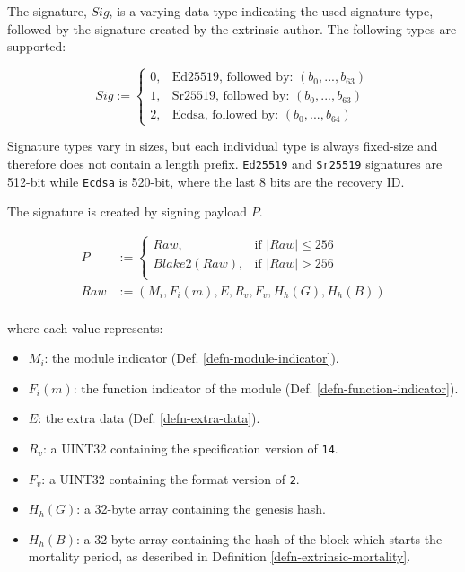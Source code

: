 \begin{definition}
    \label{defn-extrinsic-signature}
    The signature, $Sig$, is a varying data type indicating the used signature
    type, followed by the signature created by the extrinsic author. The
    following types are supported:

    \[
        Sig :=
        \begin{cases}
        0, & \text{Ed25519, followed by: } (b_0, ...,b_{63}) \\
        1, & \text{Sr25519, followed by: } (b_0, ...,b_{63}) \\
        2, & \text{Ecdsa, followed by: } (b_0, ...,b_{64})
        \end{cases}
    \]

    Signature types vary in sizes, but each individual type is always fixed-size
    and therefore does not contain a length prefix. \verb|Ed25519| and
    \verb|Sr25519| signatures are 512-bit while \verb|Ecdsa| is 520-bit, where
    the last 8 bits are the recovery ID.
    \newline

    The signature is created by signing payload $P$.

    \begin{equation}
        \begin{aligned}
        P &:= \begin{cases}
            Raw, & \text{if } |Raw| \leq 256\\
            Blake2(Raw), & \text{if } |Raw| > 256\\
        \end{cases}\\
        Raw &:= (M_i, F_i(m), E, R_v, F_v, H_h(G), H_h(B))\\
        \end{aligned}
    \end{equation}

    where each value represents:
    \begin{itemize}
        \item $M_i$: the module indicator (Def. \ref{defn-module-indicator}).
        \item $F_i(m)$: the function indicator of the module
        (Def. \ref{defn-function-indicator}).
        \item $E$: the extra data (Def. \ref{defn-extra-data}).
        \item $R_v$: a UINT32 containing the specification version of \verb|14|.
        \item $F_v$: a UINT32 containing the format version of \verb|2|.
        \item $H_h(G)$: a 32-byte array containing the genesis hash.
        \item $H_h(B)$: a 32-byte array containing the hash of the block which
        starts the mortality period, as described in Definition
        \ref{defn-extrinsic-mortality}.
    \end{itemize}
\end{definition}

